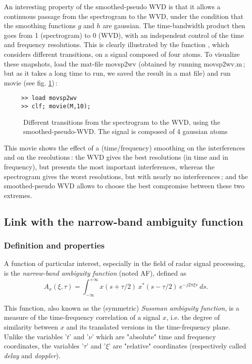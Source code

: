   An interesting property of the smoothed-pseudo WVD is that it allows a
continuous passage from the spectrogram to the WVD, under the condition
that the smoothing functions $g$ and $h$ are gaussian. The time-bandwidth
product then goes from 1 (spectrogram) to 0 (WVD), with an independent
control of the time and frequency resolutions. This is clearly illustrated
by the function , which
considers different transitions, on a signal composed of four atoms. To
visualize these snapshots, load the mat-file {\ttfamily movsp2wv} (obtained
by running {\ttfamily movsp2wv.m}\,; but as it takes a long time to run, we
saved the result in a mat file) and run {\ttfamily movie} (see
fig. \ref{En1fig11})\,:
\begin{verbatim}
     >> load movsp2wv
     >> clf; movie(M,10);
\end{verbatim}
\begin{figure}[htb]
\epsfxsize=10cm
\epsfysize=10cm
\centerline{}
\caption{\label{En1fig11}Different transitions from the spectrogram to the
WVD, using the smoothed-pseudo-WVD. The signal is composed of 4 gaussian
atoms}
\end{figure}
This movie shows the effect of a (time/frequency) smoothing on the
interferences and on the resolutions\,: the WVD gives the best resolutions
(in time and in frequency), but presents the most important interferences,
whereas the spectrogram gives the worst resolutions, but with nearly no
interferences\,; and the smoothed-pseudo WVD allows to choose the best
compromise between these two extremes.


\subsection{Link with the narrow-band ambiguity function}
\subsubsection{Definition and properties}
\label{NBAF}
  A function of particular interest, especially in the field of radar
signal processing, is the {\it narrow-band ambiguity function} (noted AF),
defined as
\[A_x(\xi,\tau)=\int_{-\infty}^{+\infty} x(s+\tau/2)\ x^*(s-\tau/2)\
e^{-j2\pi \xi s}\ ds.\] 

This function, also known as the (symmetric) {\it Sussman ambiguity
function}, is a measure of the time-frequency correlation of a signal $x$,
i.e. the degree of similarity between $x$ and its translated versions in
the time-frequency plane. Unlike the variables '$t$' and '$\nu$' which are
"absolute" time and frequency coordinates, the variables '$\tau$' and
'$\xi$' are "relative" coordinates (respectively called {\it delay} and
{\it doppler}).\index{delay}\index{doppler} 
 
